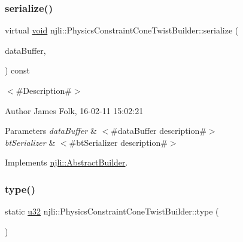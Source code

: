 \subsubsection{\texorpdfstring{serialize()}{serialize()}}
{\footnotesize\ttfamily virtual \mbox{\hyperlink{_thread_8h_af1e856da2e658414cb2456cb6f7ebc66}{void}} njli\+::\+Physics\+Constraint\+Cone\+Twist\+Builder\+::serialize (\begin{DoxyParamCaption}\item[{\mbox{\hyperlink{_thread_8h_af1e856da2e658414cb2456cb6f7ebc66}{void}} $\ast$}]{data\+Buffer,  }\item[{bt\+Serializer $\ast$}]{ }\end{DoxyParamCaption}) const\hspace{0.3cm}{\ttfamily [virtual]}}



$<$\#\+Description\#$>$ 

\begin{DoxyAuthor}{Author}
James Folk, 16-\/02-\/11 15\+:02\+:21
\end{DoxyAuthor}

\begin{DoxyParams}{Parameters}
{\em data\+Buffer} & $<$\#data\+Buffer description\#$>$ \\
\hline
{\em bt\+Serializer} & $<$\#bt\+Serializer description\#$>$ \\
\hline
\end{DoxyParams}


Implements \mbox{\hyperlink{classnjli_1_1_abstract_builder_ab66b774e02ccb9da554c9aab7fa6d981}{njli\+::\+Abstract\+Builder}}.

\mbox{\label{classnjli_1_1_physics_constraint_cone_twist_builder_a9b680e5ddfc584561df99feb64c99533}} 
\subsubsection{\texorpdfstring{type()}{type()}}
{\footnotesize\ttfamily static \mbox{\hyperlink{_util_8h_a10e94b422ef0c20dcdec20d31a1f5049}{u32}} njli\+::\+Physics\+Constraint\+Cone\+Twist\+Builder\+::type (\begin{DoxyParamCaption}{ }\end{DoxyParamCaption})\hspace{0.3cm}{\ttfamily [static]}}

